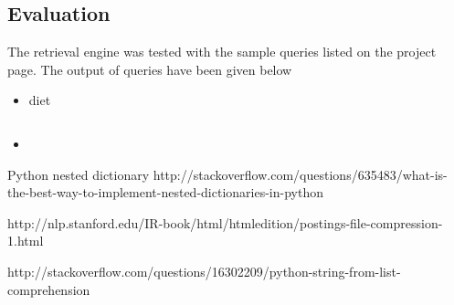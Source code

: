 \documentclass[paper=a4, fontsize=11pt]{scrartcl}
\numberwithin{equation}{section}		%
\numberwithin{figure}{section}			%
\numberwithin{table}{section}				%
\begin{document}
\subsection{Evaluation}

The retrieval engine was tested with the sample queries listed on the project page. The output of queries have been given below

\begin{itemize}

\item diet \\ 

\begin{verbatim}

\end{verbatim}

\item

\end{itemize}


\clearpage

\begin{thebibliography}{1}

Python nested dictionary http://stackoverflow.com/questions/635483/what-is-the-best-way-to-implement-nested-dictionaries-in-python

 http://nlp.stanford.edu/IR-book/html/htmledition/postings-file-compression-1.html

 http://stackoverflow.com/questions/16302209/python-string-from-list-comprehension


  \end{thebibliography}

\end{document}
